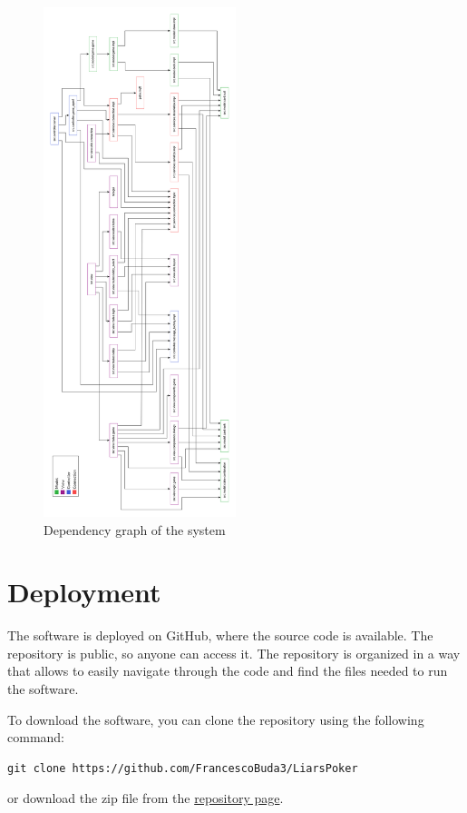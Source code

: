 \documentclass{scrartcl}
\begin{document}
\begin{figure}
      \centering
      \includegraphics[width=0.5\textwidth]{figures/dependencyGraph.png}
      \caption{Dependency graph of the system}
      \label{fig:dependencyGraph}
\end{figure}

\newpage
\section{Deployment}\label{deployment}

The software is deployed on GitHub, where the source code is available. The repository is public, so 
anyone can access it. The repository is organized in a way that allows to easily navigate through the 
code and find the files needed to run the software.

To download the software, you can clone the repository using the following command:
\begin{verbatim}
git clone https://github.com/FrancescoBuda3/LiarsPoker
\end{verbatim}
or download the zip file from the \href{https://github.com/FrancescoBuda3/LiarsPoker}{repository page}. 
\end{document}
